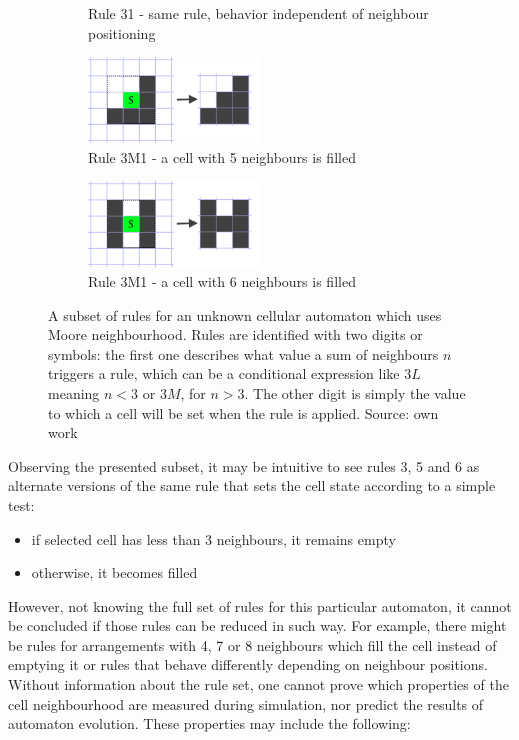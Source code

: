 \documentclass[12pt]{report}
\begin{document}
\begin{figure}[h]
\begin{subfigure}[t]{0.4\textwidth}
		\caption{Rule 31 - same rule, behavior independent of neighbour positioning} 
	\end{subfigure} \hspace{1em} 
	\hfill
	\begin{subfigure}[t]{0.4\textwidth}
		\centering
		\includegraphics[width=0.5\textwidth]{images/rule5alive}
		\caption{Rule 3M1 - a cell with 5 neighbours is filled} 
	\end{subfigure} \hspace{1em} 
	\hfill
	\begin{subfigure}[t]{0.4\textwidth}
		\centering
		\includegraphics[width=0.5\textwidth]{images/rule6alive}
		\caption{Rule 3M1 - a cell with 6 neighbours is filled} 
	\end{subfigure} \hspace{1em} 
	\hfill
	\caption{A subset of rules for an unknown cellular automaton which uses Moore neighbourhood. Rules are identified with two digits or symbols: the first one describes what value a sum of neighbours $n$ triggers a rule, which can be a conditional expression like $3L$ meaning $n < 3$ or $3M$, for $n > 3$. The other digit is simply the value to which a cell will be set when the rule is applied. Source: own work}
	\label{fig:examplecarules}
\end{figure}

Observing the presented subset, it may be intuitive to see rules 3, 5 and 6 as alternate versions of the same rule that sets the cell state according to a simple test: 
\begin{itemize}
	\item if selected cell has less than 3 neighbours, it remains empty
	\item otherwise, it becomes filled
\end{itemize} 
However, not knowing the full set of rules for this particular automaton, it cannot be concluded if those rules can be reduced in such way. For example, there might be rules for arrangements with 4, 7 or 8 neighbours which fill the cell instead of emptying it or rules that behave differently depending on neighbour positions. Without information about the rule set, one cannot prove which properties of the cell neighbourhood are measured during simulation, nor predict the results of automaton evolution. These properties may include the following:
\end{document}
